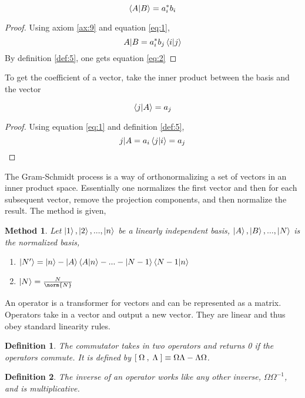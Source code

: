 \documentclass{tufte-book}
\newtheorem{definition}{Definition}
\newtheorem{method}{Method}
\newcommand{\commutator}[3][1.2em]{[ \makebox[#1]{$#2$} , \makebox[#1]{$#3$} ]}
\begin{document}
\begin{equation}
	\label{eq:2}
	\braket{A|B} = a_i^*b_i
\end{equation}

\begin{proof}
	Using axiom \ref{ax:9} and equation \ref{eq:1},
	\[{A|B} = a_i^*b_j\braket{i|j}\]
	By definition \ref{def:5}, one gets equation \ref{eq:2}
\end{proof}

To get the coefficient of a vector, take the inner product between the basis and the vector

\begin{equation}
	\label{eq:3}
	\braket{j|A} = a_j
\end{equation}

\begin{proof}
	Using equation \ref{eq:1} and definition \ref{def:5},
	\[{j|A} = a_i\braket{j|i} = a_j\]
\end{proof}

The Gram-Schmidt process is a way of orthonormalizing a set of vectors in an inner product space. Essentially one normalizes the first vector and then for each subsequent vector, remove the projection components, and then normalize the result. The method is given,

\begin{method}
	\label{meth:1}
	Let $\ket{1}, \ket{2}, ..., \ket{n}$ be a linearly independent basis, $\ket{A}, \ket{B}, ..., \ket{N}$ is the normalized basis,
	\begin{enumerate}
		\item $\ket{N'} = \ket{n} - \ket{A}\braket{A|n} - ... - \ket{N-1}\braket{N-1|n}$
		\item $\ket{N} = \frac{N}{\norm{N}}$
	\end{enumerate}
\end{method}

An operator is a transformer for vectors and can be represented as a matrix. Operators take in a vector and output a new vector. They are linear and thus obey standard linearity rules.

\begin{definition}
	\label{def:6}
	The commutator takes in two operators and returns 0 if the operators commute. It is defined by $\commutator{\Omega}{\Lambda} \equiv \Omega\Lambda - \Lambda\Omega$.
\end{definition}

\begin{definition}
	\label{def:7}
	The inverse of an operator works like any other inverse, $\Omega\Omega^{-1}$, and is multiplicative.
\end{definition}
\end{document}
